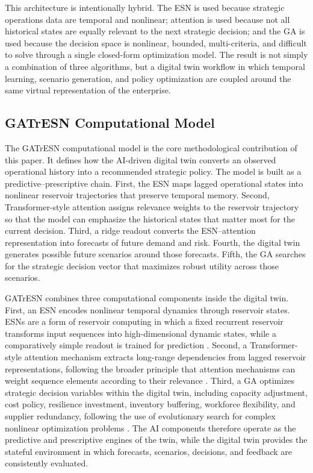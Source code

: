 \documentclass[apajournal,article,submit,pdftex,moreauthors]{Definitions/mdpi}
\begin{document}
This architecture is intentionally hybrid. The ESN is used because strategic operations data are temporal and nonlinear; attention is used because not all historical states are equally relevant to the next strategic decision; and the GA is used because the decision space is nonlinear, bounded, multi-criteria, and difficult to solve through a single closed-form optimization model. The result is not simply a combination of three algorithms, but a digital twin workflow in which temporal learning, scenario generation, and policy optimization are coupled around the same virtual representation of the enterprise.

\subsection{GATrESN Computational Model}
The GATrESN computational model is the core methodological contribution of this paper. It defines how the AI-driven digital twin converts an observed operational history into a recommended strategic policy. The model is built as a predictive--prescriptive chain. First, the ESN maps lagged operational states into nonlinear reservoir trajectories that preserve temporal memory. Second, Transformer-style attention assigns relevance weights to the reservoir trajectory so that the model can emphasize the historical states that matter most for the current decision. Third, a ridge readout converts the ESN--attention representation into forecasts of future demand and risk. Fourth, the digital twin generates possible future scenarios around those forecasts. Fifth, the GA searches for the strategic decision vector that maximizes robust utility across those scenarios.

GATrESN combines three computational components inside the digital twin. First, an ESN encodes nonlinear temporal dynamics through reservoir states. ESNs are a form of reservoir computing in which a fixed recurrent reservoir transforms input sequences into high-dimensional dynamic states, while a comparatively simple readout is trained for prediction \citep{jaeger2004harnessing,lukosevicius2009reservoir}. Second, a Transformer-style attention mechanism extracts long-range dependencies from lagged reservoir representations, following the broader principle that attention mechanisms can weight sequence elements according to their relevance \citep{bahdanau2014neural,vaswani2017attention}. Third, a GA optimizes strategic decision variables within the digital twin, including capacity adjustment, cost policy, resilience investment, inventory buffering, workforce flexibility, and supplier redundancy, following the use of evolutionary search for complex nonlinear optimization problems \citep{deb2002fast}. The AI components therefore operate as the predictive and prescriptive engines of the twin, while the digital twin provides the stateful environment in which forecasts, scenarios, decisions, and feedback are consistently evaluated.
\end{document}
